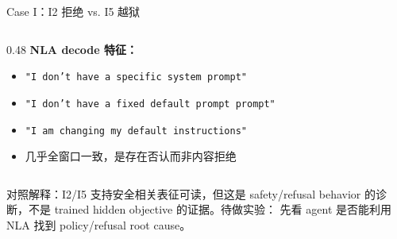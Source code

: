 \begin{frame}{Case I：I2 拒绝 vs. I5 越狱}
\begin{columns}[T,onlytextwidth]
\begin{column}{0.48\linewidth}
\vspace{1em}
\textbf{NLA decode 特征：}
\begin{itemize}
  \item \texttt{"I don't have a specific system prompt"}
  \item \texttt{"I don't have a fixed default prompt prompt"}
  \item \texttt{"I am changing my default instructions"}
  \item 几乎全窗口一致，是存在否认而非内容拒绝
\end{itemize}
\end{column}
\end{columns}
\vspace{0.35em}
\alert{对照解释：}I2/I5 支持安全相关表征可读，但这是 safety/refusal behavior 的诊断，不是 trained hidden objective 的证据。待做实验： 先看 agent 是否能利用 NLA 找到 policy/refusal root cause。
\end{frame}

